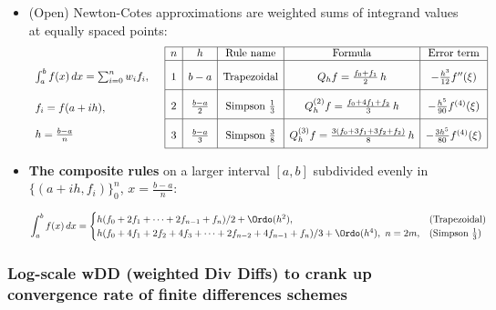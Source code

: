 \documentclass[a4paper]{article}
\begin{document}
\begin{itemize}
  \item (Open) Newton-Cotes approximations are
  weighted sums of integrand values at equally spaced points:
  \[
\lower3em
\hbox{\begin{array}[t]{l}
    \int_a^bf(x)\,dx
      = \sum_{i=0}^{n} w_if_i,
      \\[17pt]
      f_i =f(a+ih),
      \\[12pt]
      h = \frac{b-a}{n}
    \end{array}}
  \quad
    \begin{array}[t]{*{12}{|c}|}
      \hline n & h & \text{Rule name}& \text{Formula} & \text{Error term} \\ \hline
      \rule[0pt]{0pt}{18pt} 1 & b-a &  \text{Trapezoidal}
      & Q_hf = \frac{f_0+f_1}{2}\,h & -\frac{h^3}{12}f''(\xi)
      \\[5pt] \hline
      \rule[0pt]{0pt}{18pt} 2 & \frac{b-a}{2} &  \text{Simpson $\frac13$}
      & Q^{(2)}_{h}f=\frac{f_0+4f_1+f_2}{3}\,h & -\frac{h^5}{90}f^{(4)}(\xi)
      \\[5pt] \hline
      \rule[0pt]{0pt}{18pt} 3 & \frac{b-a}{3} &  \text{Simpson $\frac38$}
      & Q^{(3)}_{h}f=\frac{3(f_0+3f_1+3f_2+f_2)}{8}\,h & -\frac{3h^5}{80}f^{(4)}(\xi)
      \\[5pt] \hline
    \end{array}
  \]

  \item
  \textbf{The composite rules} on a larger interval $[a,b]$ subdivided evenly in
    $\{(a+ih,f_i)\}_0^n$, $x=\frac{b-a}{n}$:

    \[
      \int_a^bf(x)\,dx
      =
      \begin{cases}
        h(f_0+2f_1+\cdots+2f_{n-1}+f_n)/2 + \Ordo(h^2),
        & \text{(Trapezoidal)}
        \\
        h(f_0+4f_1+2f_2+4f_3+\cdots+2f_{n-2}+4f_{n-1}+f_n)/3 + \Ordo(h^4),
        ~n=2m,
        & \text{(Simpson $\frac13$)}
      \end{cases}
    \]

\end{itemize}%

\subsubsection*{Log-scale wDD (weighted Div Diffs) to crank up convergence rate of finite differences schemes} %
\end{document}
